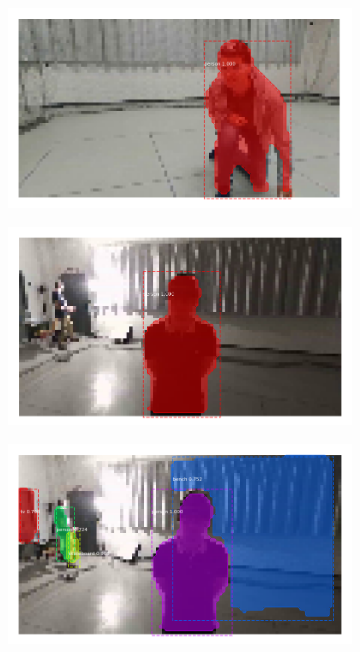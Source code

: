 \begin{figure}[!h]
\begin{center}
\begin{subfigure}[h]{0.32\textwidth}
		\end{subfigure}
		\vfill
		\begin{subfigure}[h]{0.32\textwidth}
			\centering
			\includegraphics[width=1\textwidth]{"contents/images/04-maskrcnn-train-4"}
		\end{subfigure}
		\begin{subfigure}[h]{0.32\textwidth}
			\centering
			\includegraphics[width=1\textwidth]{"contents/images/04-maskrcnn-train-5"}
		\end{subfigure}
		\begin{subfigure}[h]{0.32\textwidth}
			\centering
			\includegraphics[width=1\textwidth]{"contents/images/04-maskrcnn-train-6"}

\end{subfigure}
\end{center}
\end{figure}
